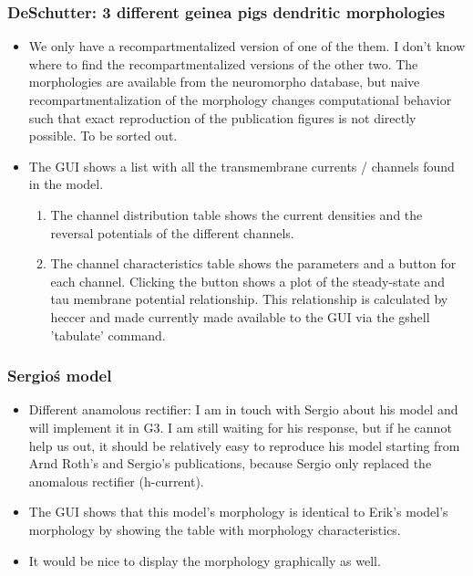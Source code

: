 \documentclass[12pt]{article}
\begin{document}
\subsubsection{DeSchutter: 3 different geinea pigs dendritic morphologies}
\begin{itemize}
\item We only have a recompartmentalized version of one of the them.
  I don't know where to find the recompartmentalized versions of the
  other two.  The morphologies are available from the neuromorpho
  database, but naive recompartmentalization of the morphology changes
  computational behavior such that exact reproduction of the
  publication figures is not directly possible.  To be sorted out.
\item The GUI shows a list with all the transmembrane currents /
  channels found in the model.
  \begin{enumerate}
  \item The channel distribution table shows the current densities and
    the reversal potentials of the different channels.
  \item The channel characteristics table shows the parameters and a
    button for each channel.  Clicking the button shows a plot of the
    steady-state and tau membrane potential relationship.  This
    relationship is calculated by heccer and made currently made
    available to the GUI via the gshell 'tabulate' command.
  \end{enumerate}
\end{itemize}


\subsubsection{Sergio\'s model}
\begin{itemize}
\item Different anamolous rectifier: I am in touch with Sergio about
  his model and will implement it in G3.  I am still waiting for his
  response, but if he cannot help us out, it should be relatively easy
  to reproduce his model starting from Arnd Roth's and Sergio's
  publications, because Sergio only replaced the anomalous rectifier
  (h-current).
\item The GUI shows that this model's morphology is identical to
  Erik's model's morphology by showing the table with morphology
  characteristics.
\item It would be nice to display the morphology graphically as well.
\end{itemize}
\end{document}
